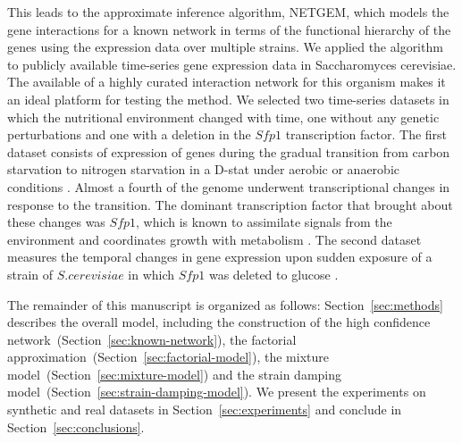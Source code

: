 \documentclass{bioinfo}
\begin{document}
This leads to the approximate inference algorithm, NETGEM, which models the gene
  interactions for a known network in terms of the functional
  hierarchy of the genes using the expression data over multiple
  strains. 
We applied the algorithm to publicly available time-series gene expression
data in Saccharomyces cerevisiae. The available of a highly curated
interaction network for this organism makes it an ideal platform for
testing the method. We selected two time-series datasets in which the
nutritional environment changed with time, one without any genetic
perturbations and one with a deletion in the $Sfp1$ transcription
factor. The first dataset consists of expression of genes during the
gradual transition from carbon starvation to nitrogen starvation in a
D-stat under aerobic or anaerobic conditions . Almost a fourth of the genome underwent transcriptional changes
in response to the transition. The dominant transcription factor that
brought about these changes was $Sfp1$, which is known to assimilate
signals from the environment and coordinates growth with metabolism
. The second dataset measures the temporal
changes in gene expression upon sudden exposure of a strain of
$S. cerevisiae$ in which $Sfp1$ was deleted to glucose .

The remainder of this manuscript is organized as follows:
Section~\ref{sec:methods} describes the overall model, including the construction of the high
confidence network~(Section~\ref{sec:known-network}), the factorial
approximation~(Section~\ref{sec:factorial-model}), the mixture
model~(Section~\ref{sec:mixture-model}) and the strain damping
model~(Section~\ref{sec:strain-damping-model}). We present the experiments on synthetic and
real datasets in Section~\ref{sec:experiments} and conclude in
Section~\ref{sec:conclusions}.


\end{document}
